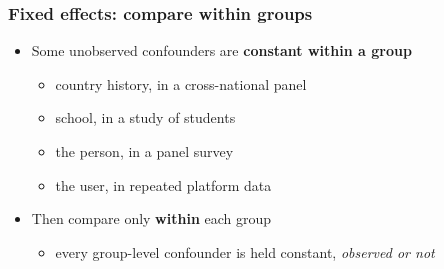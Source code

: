 \begin{frame}
\frametitle{Fixed effects: compare within groups}
\centering

\begin{itemize}
  \item Some unobserved confounders are \textbf{constant within a group}
  \begin{itemize}
    \item country history, in a cross-national panel
    \item school, in a study of students
    \item the person, in a panel survey
    \item the user, in repeated platform data
  \end{itemize}
  \vspace{8pt}
  \item<2-> Then compare only \textbf{within} each group
  \begin{itemize}
    \item every group-level confounder is held constant, \textit{observed or not}
  \end{itemize}
\end{itemize}

\end{frame}

